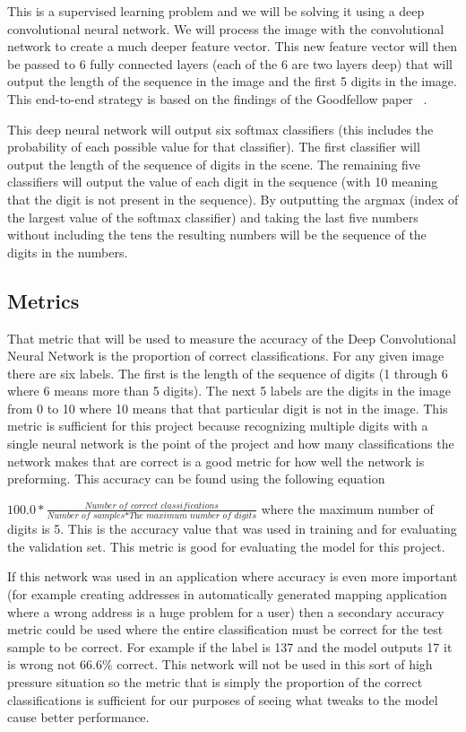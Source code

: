 \documentclass[12pt,twocolumn,letterpaper]{article}
\begin{document}
This is a supervised learning problem and we will be solving it using a deep 
convolutional neural network. We will process the image with the convolutional 
network to create a much deeper feature vector. This new feature vector will then 
be passed to 6 fully connected layers (each of the 6 are two layers deep) that 
will output the length of the sequence in the image and the first 5 digits in 
the image. This end-to-end strategy is based on the findings of the 
Goodfellow \etal paper ~\cite{goodfellow}. 

This deep neural network will output six softmax classifiers (this includes the 
probability of each possible value for that classifier). The first classifier 
will output the length of the sequence of digits in the scene. The remaining five 
classifiers will output the value of each digit in the sequence (with 10 meaning 
that the digit is not present in the sequence). By outputting the argmax (index 
of the largest value of the softmax classifier) and taking the last five numbers 
without including the tens the resulting numbers will be the sequence of the 
digits in the numbers. 

\subsection{Metrics}
That metric that will be used to measure the accuracy of the Deep Convolutional 
Neural Network is the proportion of correct classifications. For any given image 
there are six labels. The first is the length of the sequence of digits (1 through
6 where 6 means more than 5 digits). The next 5 labels are the digits in the 
image from 0 to 10 where 10 means that that particular digit is not in the image.
This metric is sufficient for this project because recognizing multiple digits 
with a single neural network is the point of the project and how many 
classifications the network makes that are correct is a good metric for how well the
network is preforming. This accuracy can be found using the following equation

$100.0*\frac{\textit{Number of correct classifications}}{\textit{Number of samples}*\textit{The maximum number of digits}}$ 
where the maximum number of digits is 5. This is the accuracy value that was used 
in training and for evaluating the validation set. This metric is good for 
evaluating the model for this project. 

If this network was used in an application where accuracy is 
even more important (for example creating addresses in automatically generated 
mapping application where a wrong address is a huge problem for a user) then a 
secondary accuracy metric could be used where
the entire classification must be correct for the test sample to be correct. For 
example if the label is 137 and the model outputs 17 it is wrong not 66.6\% 
correct. This network will not be used in this sort of high pressure situation so
the metric that is simply the proportion of the correct classifications is 
sufficient for our purposes of seeing what tweaks to the model cause better 
performance.
\end{document}
